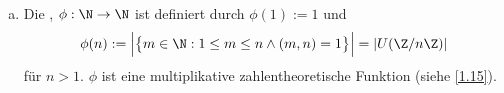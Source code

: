 \begin{nt}
\begin{enumerate}[a)]
			\begin{proof}
				\begin{segnb}{\ProofImplication}
					Es gilt $n,m \divs a - b$.
					Wegen $\kgV(n,m) = \f{nm}{\ggT(n,m)} = nm$ daher auch $nm \divs a - b$, also $a \equiv b \bmod nm$.
				\end{segnb}
				\begin{segnb}{\ProofImplication*}
					Wegen $nm \divs a - b$ ist $n,m \divs nm \divs a - b$, also $a \equiv b \bmod n,m$.
				\end{segnb}
			\end{proof}
		\item
			Die , $\phi: \N \to \N$ ist definiert durch $\phi(1) := 1$ und
			\[
				\phi(n)
				:= \Big| \big\{m \in \N : 1 \le m \le n \land (m,n) = 1 \big\} \Big|
				= |U(\Z / n\Z)|
			\]
			für $n > 1$.
			$\phi$ ist eine multiplikative zahlentheoretische Funktion (siehe \ref{1.15}).
	\end{enumerate}
\end{nt}


